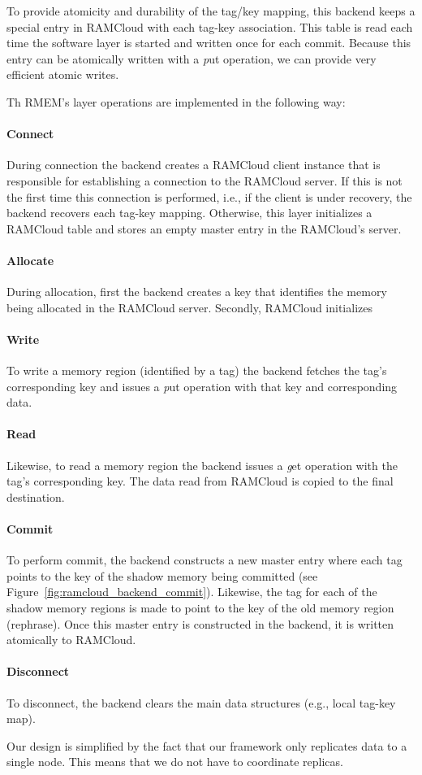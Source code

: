 To provide atomicity and durability of the tag/key mapping, this backend keeps a special entry in RAMCloud with each tag-key association. This table is read each time the software layer is started and written once for each commit. Because this entry can be atomically written with a {\emph put} operation, we can provide very efficient atomic writes.

Th RMEM's layer operations are implemented in the following way:

\paragraph {\bf Connect} During connection the backend creates a RAMCloud client instance that is responsible for establishing a connection to the RAMCloud server.
If this is not the first time this connection is performed, i.e., if the client is under recovery, the backend recovers each tag-key mapping.
Otherwise, this layer initializes a RAMCloud table and stores an empty master entry in the RAMCloud's server.
\paragraph{\bf Allocate} During allocation, first the backend creates a key that identifies the memory being allocated in the RAMCloud server. Secondly, RAMCloud initializes
\paragraph{\bf Write} To write a memory region (identified by a tag) the backend fetches the tag's corresponding key and issues a {\emph put } operation with that key and corresponding data.
\paragraph{\bf Read} Likewise, to read a memory region the backend issues a {\emph get} operation with the tag's corresponding key. The data read from RAMCloud is copied to the final destination.
\paragraph{\bf Commit} To perform commit, the backend constructs a new master entry where each tag points to the key of the shadow memory being committed (see Figure~\ref{fig:ramcloud_backend_commit}). Likewise, the tag for each of the shadow
memory regions is made to point to the key of the old memory region (rephrase). Once this master entry is constructed in the backend, it is written atomically to RAMCloud.
\paragraph{\bf Disconnect} To disconnect, the backend clears the main data structures (e.g., local tag-key map).

Our design is simplified by the fact that our framework only replicates data to a single node. This means that we do not have to coordinate replicas.

